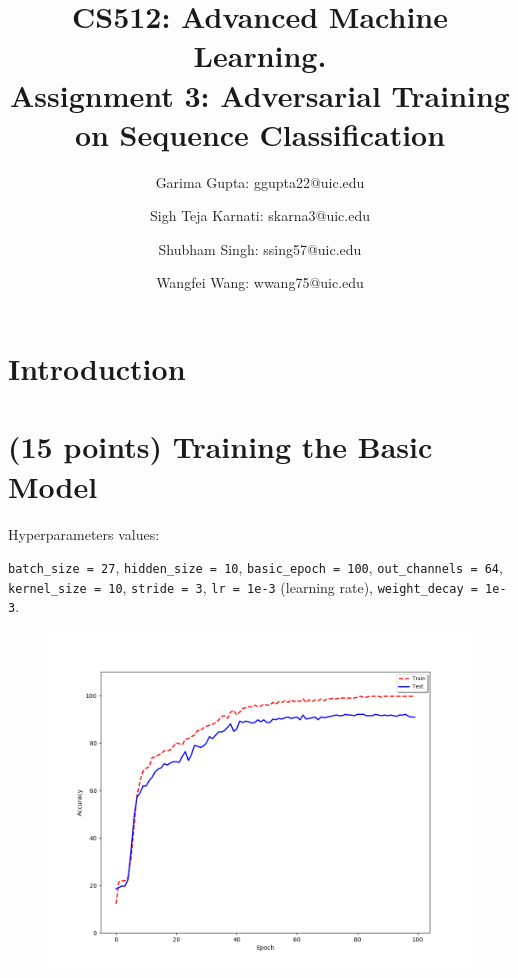 \documentclass[11pt]{report}
\begin{document}
\title{
  CS512: Advanced Machine Learning. \\
  \large Assignment 3: Adversarial Training on Sequence Classification}

\author{Garima Gupta: ggupta22@uic.edu \and Sigh Teja Karnati: skarna3@uic.edu \and
 Shubham Singh: ssing57@uic.edu \and Wangfei Wang: wwang75@uic.edu}

\graphicspath{{../../Figures/}}

\maketitle

\section{Introduction}
\section{(15 points) Training the Basic Model}

Hyperparameters values: 

\texttt{batch\_size = 27}, \texttt{hidden\_size = 10}, \texttt{basic\_epoch = 100}, \texttt{out\_channels = 64}, \texttt{kernel\_size = 10},  \texttt{stride = 3}, \texttt{lr = 1e-3} (learning rate), \texttt{weight\_decay = 1e-3}. 

\begin{figure}[h]
    \includegraphics[width = 15 cm]{BasicModel.png}
    \centering
\end{figure}
\end{document}
